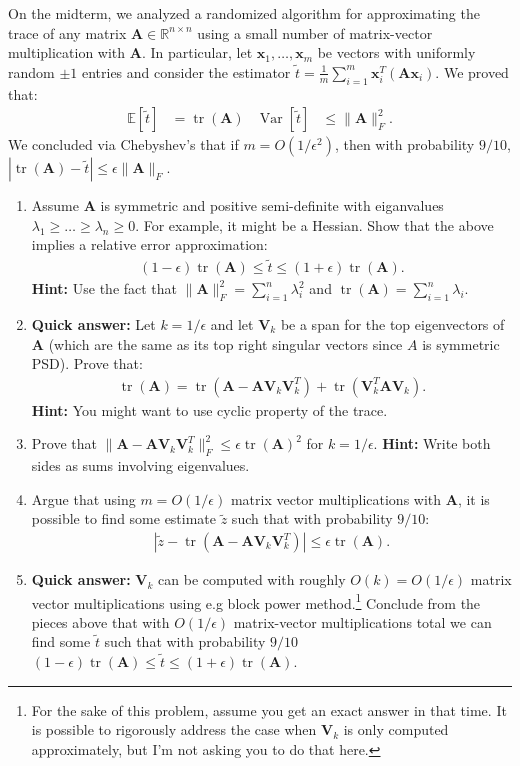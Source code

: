 \documentclass[10pt]{article}
\newcommand{\bv}[1]{\mathbf{#1}}
\newcommand{\R}{\mathbb{R}}
\newcommand{\E}{\mathbb{E}}
\DeclareMathOperator{\Var}{Var}
\DeclareMathOperator{\tr}{tr}
\begin{document}
On the midterm, we analyzed a randomized algorithm for approximating the trace of any matrix $\bv{A} \in \R^{n\times n}$ using a small number of matrix-vector multiplication with $\bv{A}$. In particular, let $\bv{x}_1,\ldots, \bv{x}_m$ be vectors with uniformly random $\pm 1$ entries and consider the estimator $\tilde{t} = \frac{1}{m}\sum_{i=1}^m \bv{x}_i^T(\bv{A}\bv{x}_i)$. We proved that:
\begin{align*}
	\E[\tilde{t}] &= \tr(\bv{A}) & \Var[\tilde{t}] &\leq \|\bv{A}\|_F^2. 
\end{align*}  
We concluded via Chebyshev's that if $m = O(1/\epsilon^2)$, then with probability $9/10$, $\left|\tr(\bv{A}) - \tilde{t}\right|\leq \epsilon\|\bv{A}\|_F$.
\begin{enumerate}
	\item Assume $\bv{A}$ is symmetric and positive semi-definite with eiganvalues $\lambda_1 \geq \ldots \geq \lambda_n \geq 0$. For example, it might be a Hessian. Show that the above implies a relative error approximation:
	\begin{align*}
		(1-\epsilon)\tr(\bv{A}) \leq \tilde{t} \leq (1+\epsilon)\tr(\bv{A}).
	\end{align*}
\textbf{Hint:} Use the fact that  $\|\bv{A}\|_F^2 = \sum_{i=1}^n \lambda_i^2$ and $\tr(\bv{A}) = \sum_{i=1}^n \lambda_i$.

\item \textbf{Quick answer:} Let $k = 1/\epsilon$ and let $\bv{V}_k$ be a span for the top eigenvectors of $\bv{A}$ (which are the same as its top right singular vectors since $A$ is symmetric PSD). Prove that:
\begin{align*}
	\tr(\bv{A}) = \tr(\bv{A} - \bv{A}\bv{V}_k\bv{V}_k^T) + \tr(\bv{V}_k^T\bv{A}\bv{V}_k).
\end{align*}
\textbf{Hint:} You might want to use cyclic property of the trace. 

\item Prove that $\|\bv{A} - \bv{A}\bv{V}_k\bv{V}_k^T\|_F^2 \leq \epsilon \tr(\bv{A})^2$ for $k=1/\epsilon$. \textbf{Hint:} Write both sides as sums involving eigenvalues. 

\item Argue that using $m = O(1/\epsilon)$ matrix vector multiplications with $\bv{A}$, it is possible to find some estimate $\tilde{z}$ such that with probability $9/10$:
\begin{align*}
	\left|\tilde{z} - \tr(\bv{A} - \bv{A}\bv{V}_k\bv{V}_k^T) \right| \leq \epsilon \tr(\bv{A}).
\end{align*}
\item \textbf{Quick answer:} $\bv{V}_k$ can be computed with roughly $O(k) = O(1/\epsilon)$ matrix vector multiplications using e.g block power method.\footnote{For the sake of this problem, assume you get an exact answer in that time. It is possible to rigorously address the case when $\bv{V}_k$ is only computed approximately, but I'm not asking you to do that here.}  Conclude from the pieces above that with $O(1/\epsilon)$ matrix-vector multiplications total we can find some $\tilde{t}$ such that with probability $9/10$ $(1-\epsilon)\tr(\bv{A}) \leq \tilde{t} \leq (1+\epsilon)\tr(\bv{A})$. 
\end{enumerate}
\end{document}
